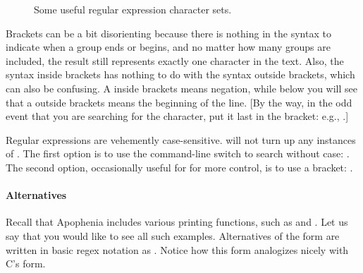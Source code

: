 \begin{figure}
\begin{center}
\end{center}
\caption{Some useful regular expression character sets.}\label{regexchar}
\end{figure}

Brackets can be a bit disorienting because there is nothing in the syntax
to indicate when a group ends or begins, and no matter how many groups are
included, the result still represents exactly one character in the text.
Also, the syntax inside brackets has nothing to do with the syntax
outside brackets, which can also be confusing. A \that{} inside brackets
means negation, while below you will see that a \that{} outside brackets
means the beginning of the line. [By the way, in the odd event that you are searching for the \that{} character, 
put it last in the bracket: e.g., .]

Regular expressions are vehemently case-sensitive.  will not turn up any instances of . The first
option is to use the  command-line switch to search without case:
. The second option, occasionally useful
for for more control, is to use a bracket: .

\paragraph{Alternatives} 
Recall that Apophenia includes various printing functions, such as
 and . Let us say that you
would like to see all such examples. Alternatives of the form  are written in basic regex notation as . Notice how this
form analogizes nicely with C's  form.

